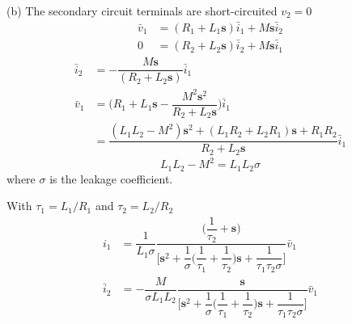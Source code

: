 \documentclass[a4paper,numbers=noenddot,12pt]{scrbook}
\begin{document}
                \noindent(b) The secondary circuit terminals are short-circuited $v_2 = 0$
                \begin{equation}
                    \begin{aligned}
                        \bar{v}_1 &= (R_1 + L_1\mathbf{s})\bar{i}_1 + M \mathbf{s} \bar{i}_2\\ %
                        0  &= (R_2 + L_2 \mathbf{s})\bar{i}_2 + M \mathbf{s} \bar{i}_1 %
                    \end{aligned}
                    \label{eq:Eq2.59}
                \end{equation}
                \begin{align*}
                    \bar{i}_2 & = - \dfrac{M \mathbf{s}}{(R_2 + L_2 \mathbf{s})} \bar{i}_1\\%
                    \bar{v}_1 & = \Big( R_1 + L_1 \mathbf{s} - \dfrac{M^2 \mathbf{s}^2}{R_2 + L_2 \mathbf{s}}\Big) \bar{i}_1 \\%
                    & = \dfrac{(L_1 L_2 - M^2) \mathbf{s}^2 +(L_1 R_2 + L_2 R_1) \mathbf{s} + R_1 R_2 }{R_2 + L_2 \mathbf{s}} \bar{i}_1 %
                \end{align*}
                \begin{equation*}
                    L_1 L_2 - M^2 = L_1 L_2 \sigma
                \end{equation*}
                where $\sigma$ is the leakage coefficient.

                With $\tau_1 = L_1 / R_1$ and $\tau_2 = L_2 / R_2$
                \begin{align*}
                    i_1 & = \dfrac{1}{L_1 \sigma} \dfrac{\Big( \dfrac{1}{\tau_2} + \mathbf{s}\Big)}{\Big[ \mathbf{s}^2 + \dfrac{1}{\sigma} \Big( \dfrac{1}{\tau_1} + \dfrac{1}{\tau_2}\Big)\mathbf{s} + \dfrac{1}{\tau_1 \tau_2 \sigma}\Big]} \bar{v}_1 \\ %
                    \bar{i}_2 & = - \dfrac{M}{\sigma L_1 L_2} \dfrac{\mathbf{s}}{\Big[ \mathbf{s}^2 + \dfrac{1}{\sigma} \Big( \dfrac{1}{\tau_1} + \dfrac{1}{\tau_2}\Big)\mathbf{s} + \dfrac{1}{\tau_1 \tau_2 \sigma}\Big]} \bar{v}_1 %
                \end{align*} 
\end{document}

